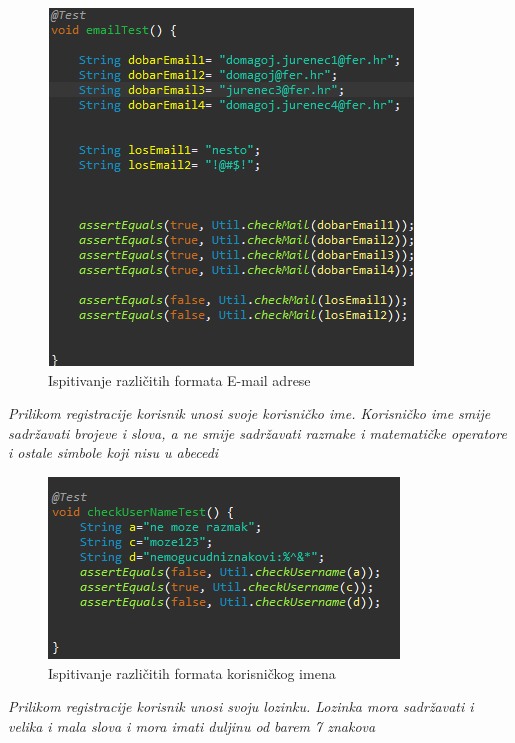 			\begin{figure}[H]
				\includegraphics[scale=1]{slike/Junit1.png}
				\centering
				\caption{Ispitivanje različitih formata E-mail adrese}
				\label{fig:promjene}
			\end{figure}
		\newpage
		\textit{Prilikom registracije korisnik unosi svoje korisničko ime. Korisničko ime smije sadržavati brojeve i slova, a ne smije sadržavati razmake i matematičke operatore i ostale simbole koji nisu u abecedi }
		
			\begin{figure}[H]
				\includegraphics[scale=1]{slike/Junit2.png}
				\centering
				\caption{Ispitivanje različitih formata korisničkog imena}
				\label{fig:promjene}
			\end{figure}
			
			\textit{Prilikom registracije korisnik unosi svoju lozinku. Lozinka mora sadržavati i velika i mala slova i mora imati duljinu od barem 7 znakova }
			
